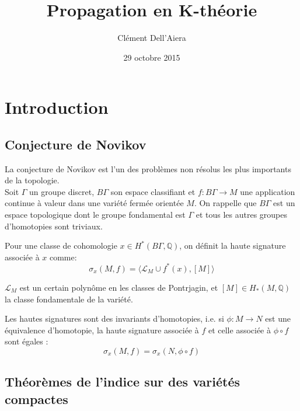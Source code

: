 \documentclass{beamer}
\title{Propagation en K-théorie}
\author{Clément Dell'Aiera}\institute{Université de Lorraine}
\date{29 octobre 2015}
\begin{document}
\begin{frame}
\titlepage
\end{frame}

\section{Introduction}

\subsection{Conjecture de Novikov}

\begin{frame}
La conjecture de Novikov est l'un des problèmes non résolus les plus importants de la topologie.\\
Soit $\Gamma$ un groupe discret, $B\Gamma$ son espace classifiant et $f: B\Gamma\rightarrow M$ une application continue à valeur dans une variété fermée orientée $M$. On rappelle que $B\Gamma$ est un espace topologique dont le groupe fondamental est $\Gamma$ et tous les autres groupes d'homotopies sont triviaux. \\
\begin{definition}
Pour une classe de cohomologie $x\in H^*(B\Gamma,\mathbb Q)$, on définit la haute signature associée à $x$ comme:
\[\sigma_x(M,f) = \langle \mathcal L_M \cup f^*(x), [M]\rangle\] 
\end{definition}

$\mathcal L_M$ est un certain polynôme en les classes de Pontrjagin, et $[M]\in H_*(M,\mathbb Q)$ la classe fondamentale de la variété.
\end{frame}

\begin{frame}
\begin{conj}[Novikov]
Les hautes signatures sont des invariants d'homotopies, i.e. si $\phi : M\rightarrow N$ est une équivalence d'homotopie, la haute signature associée à $f$ et celle associée à $\phi\circ f$ sont égales :
\[\sigma_x(M,f)=\sigma_x(N,\phi\circ f)\]
\end{conj}
\end{frame}

\subsection{Théorèmes de l'indice sur des variétés compactes}
\end{document}
